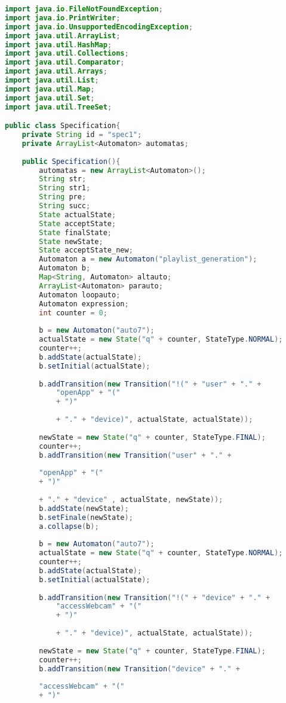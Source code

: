 \begin{lstlisting}[language=java, caption={\textit{Specification} osztály.},captionpos=b,label=specification_class]
import java.io.FileNotFoundException;
import java.io.PrintWriter;
import java.io.UnsupportedEncodingException;
import java.util.ArrayList;
import java.util.HashMap;
import java.util.Collections;
import java.util.Comparator;
import java.util.Arrays;
import java.util.List;
import java.util.Map;
import java.util.Set;
import java.util.TreeSet;

public class Specification{
	private String id = "spec1";
	private ArrayList<Automaton> automatas;
	
	public Specification(){
		automatas = new ArrayList<Automaton>();
		String str;
		String str1;
		String pre;
		String succ;
		State actualState;
		State acceptState;
		State finalState;
		State newState;
		State acceptState_new;
		Automaton a = new Automaton("playlist_generation");
		Automaton b;
		Map<String, Automaton> altauto;
		ArrayList<Automaton> parauto;
		Automaton loopauto;
		Automaton expression;
		int counter = 0;
		
		b = new Automaton("auto7");
		actualState = new State("q" + counter, StateType.NORMAL);
		counter++;
		b.addState(actualState);
		b.setInitial(actualState);
											
		b.addTransition(new Transition("!(" + "user" + "." +	
			"openApp" + "("
			+ ")"
			
			+ "." + "device)", actualState, actualState));
		
		newState = new State("q" + counter, StateType.FINAL);
		counter++;
		b.addTransition(new Transition("user" + "." +
		
		"openApp" + "("
		+ ")"
		
		+ "." + "device" , actualState, newState));
		b.addState(newState);
		b.setFinale(newState);
		a.collapse(b);
		
		b = new Automaton("auto7");
		actualState = new State("q" + counter, StateType.NORMAL);
		counter++;
		b.addState(actualState);
		b.setInitial(actualState);
											
		b.addTransition(new Transition("!(" + "device" + "." +	
			"accessWebcam" + "("
			+ ")"
			
			+ "." + "device)", actualState, actualState));
		
		newState = new State("q" + counter, StateType.FINAL);
		counter++;
		b.addTransition(new Transition("device" + "." +
		
		"accessWebcam" + "("
		+ ")"
		

\end{lstlisting}
